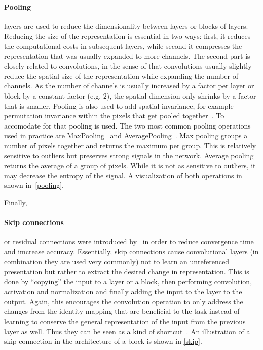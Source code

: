\paragraph{Pooling} layers are used to reduce the dimensionality between layers or blocks of layers.
Reducing the size of the representation is essential in two ways: first, it reduces the computational costs in subsequent layers, while second it compresses the representation that was usually expanded to more channels.
The second part is closely related to convolutions, in the sense of that convolutions usually slightly reduce the spatial size of the representation while expanding the number of channels.
As the number of channels is usually increased by a factor per layer or block by a constant factor (e.g. $2$), the spatial dimension only shrinks by a factor that is smaller.
Pooling is also used to add spatial invariance, for example permutation invariance within the pixels that get pooled together~\autocite{goodfellow_deep_2016}.
To accomodate for that pooling is used.
The two most common pooling operations used in practice are MaxPooling~\autocite{zhou_computation_1988} and AveragePooling~\autocite{gholamalinezhad_pooling_nodate}.
Max pooling groups a number of pixels together and returns the maximum per group.
This is relatively sensitive to outliers but preserves strong signals in the network.
Average pooling returns the average of a group of pixels.
While it is not as sensitive to outliers, it may decrease the entropy of the signal.
A visualization of both operations in shown in~\ref{pooling}.

Finally, \paragraph{Skip connections} or residual connections were introduced by~\autocite{he_deep_2016} in order to reduce convergence time and imcrease accuracy.
Essentially, skip connections cause convolutional layers (in combination they are used very commonly) not to learn an unreferenced presentation but rather to extract the desired change in representation.
This is done by ``copying'' the input to a layer or a block, then performing convolution, activation and normalization and finally adding the input to the layer to the output.
Again, this encourages the convolution operation to only address the changes from the identity mapping that are beneficial to the task instead of learning to conserve the general representation of the input from the previous layer as well.
Thus they can be seen as a kind of shortcut~\autocite{he_deep_2016}.
An illustration of a skip connection in the architecture of a block is shown in \ref{skip}.

